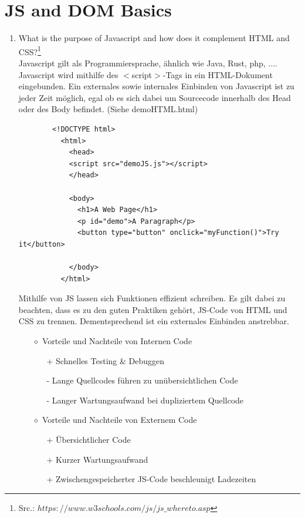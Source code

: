 \documentclass[11pt]{article}
\begin{document}
    \section{JS and DOM Basics}
    \begin{enumerate}[\thesection .1]
        \item What is the purpose of Javascript and how does it complement HTML and CSS?\footnote[1]{Src.: $https://www.w3schools.com/js/js\_whereto.asp $}\\
        Javascript gilt als Programmiersprache, ähnlich wie Java, Rust, php, ....
        Javascript wird mithilfe des $<$script$>$-Tags in ein HTML-Dokument eingebunden.
        Ein externales sowie internales Einbinden von Javascript ist zu jeder Zeit möglich, egal ob es sich dabei um Sourcecode
        innerhalb des Head oder des Body befindet. (Siehe demoHTML.html)

        \begin{verbatim}
        <!DOCTYPE html>
          <html>
            <head>
            <script src="demoJS.js"></script>
            </head>

            <body>
              <h1>A Web Page</h1>
              <p id="demo">A Paragraph</p>
              <button type="button" onclick="myFunction()">Try it</button>

            </body>
          </html>
        \end{verbatim}
        Mithilfe von JS lassen sich Funktionen effizient schreiben.
        Es gilt dabei zu beachten, dass es zu den guten Praktiken gehört, JS-Code von HTML und CSS zu trennen.
        Dementsprechend ist ein externales Einbinden anstrebbar.
        \begin{enumerate}
            \item[$\diamond$] Vorteile und Nachteile von Internen Code
            \begin{enumerate}
                \item[+] Schnelles Testing \& Debuggen
                \item[-] Lange Quellcodes führen zu unübersichtlichen Code
                \item[-] Langer Wartungsaufwand bei dupliziertem Quellcode
            \end{enumerate}

            \item[$\diamond$] Vorteile und Nachteile von Externem Code
            \begin{enumerate}
                \item[+] Übersichtlicher Code
                \item[+] Kurzer Wartungsaufwand
                \item[+] Zwischengespeicherter JS-Code beschleunigt Ladezeiten
            \end{enumerate}
        \end{enumerate}


\end{enumerate}
\end{document}
